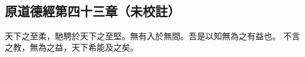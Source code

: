 ﻿%
%

\chapter{~}

\section{原道德經第四十三章（未校註）}

\begin{withgezhu}

\zhsong


天下之至柔，馳騁於天下之至堅。無有入於無間。吾是以知無為之有益也。
不言之教，無為之益，天下希能及之矣。

\end{withgezhu}
